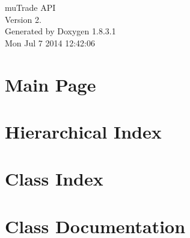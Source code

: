 \documentclass{book}
\begin{document}
\hypersetup{pageanchor=false,citecolor=blue}
\begin{titlepage}
\vspace*{7cm}
\begin{center}
{\Large mu\-Trade A\-P\-I \\[1ex]\large Version 2. }\\
\vspace*{1cm}
{\large Generated by Doxygen 1.8.3.1}\\
\vspace*{0.5cm}
{\small Mon Jul 7 2014 12:42:06}\\
\end{center}
\end{titlepage}
\clearemptydoublepage
{}
\tableofcontents
\clearemptydoublepage
{}
\hypersetup{pageanchor=true,citecolor=blue}
\chapter{Main Page}
\label{index}\hypertarget{index}{}
\chapter{Hierarchical Index}

\chapter{Class Index}

\chapter{Class Documentation}














\printindex
\end{document}
